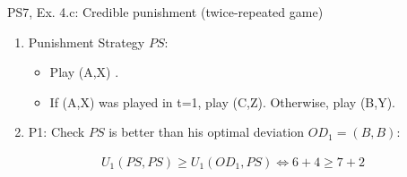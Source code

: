 \begin{frame}{PS7, Ex. 4.c: Credible punishment (twice-repeated game)}
\begin{multicols}{2}
\begin{enumerate}
        \item[b.] Punishment Strategy $PS$:
        \begin{itemize}\normalsize
          \item[t=1:] Play (A,X) .
          \item[t=2:] If (A,X) was played in t=1, play (C,Z). Otherwise, play (B,Y).
        \end{itemize}
        \item[c.] P1: Check $PS$ is better than his optimal deviation $OD_1=(B,B)$:
      \end{enumerate}
      \vspace{-14pt}
      \begin{align*}
          U_1(PS,PS)\geq U_1(OD_1,PS)\Leftrightarrow6+4\geq7+2%
      \end{align*}
      \vfill\null
    \end{multicols}
\end{frame}
